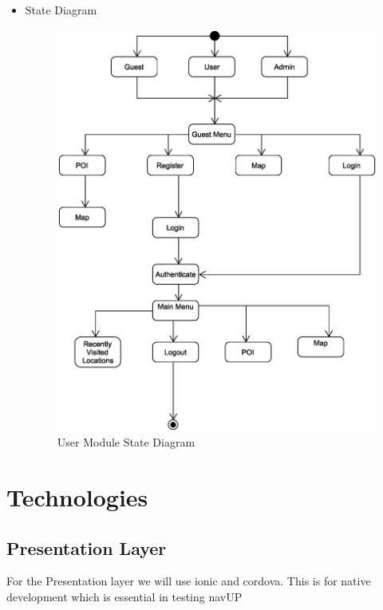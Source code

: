 \documentclass{article}
\begin{document}
\begin{itemize}
				\item State Diagram
				\begin{center}
					\begin{figure}[!h]
						\includegraphics[scale=0.5]{smdu2.eps}
						\caption{User Module State Diagram}
					\end{figure}
				\end{center}
			
 		\end{itemize}


\section{Technologies}
		
		\subsection{Presentation Layer}
		For the Presentation layer we will use ionic and cordova. This is for native development which is essential in testing navUP
		
\end{document}
